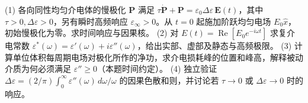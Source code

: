 (1) 各向同性均匀介电体的慢极化 \(\boldsymbol P\) 满足 \(\tau\dot{\boldsymbol P}+\boldsymbol P=\varepsilon_0\Delta\varepsilon\,\boldsymbol E(t)\)，其中 \(\tau>0,\Delta\varepsilon>0\)，另有瞬时高频响应 \(\varepsilon_\infty>0\)。从 \(t=0\) 起施加阶跃均匀电场 \(E_0\hat x\)，初始慢极化为零。求时间响应与因果核。
(2) 对 \(E(t)=\operatorname{Re}[E_0e^{-i\omega t}]\) 求复介电常数 \(\varepsilon^*(\omega)=\varepsilon'(\omega)+i\varepsilon''(\omega)\)，给出实部、虚部及静态与高频极限。
(3) 计算单位体积每周期电场对极化所作的净功，求介电损耗峰的位置和峰高，解释被动介质为何必须满足 \(\varepsilon''\ge0\)（本题时间约定）。
(4) 独立验证 \(\Delta\varepsilon=(2/\pi)\int_0^\infty\varepsilon''(\omega)\,d\omega/\omega\) 的因果色散和则，并讨论若 \(\tau\to0\) 或 \(\Delta\varepsilon\to0\) 时的响应。
